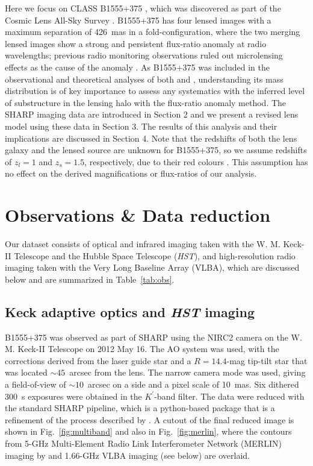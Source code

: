 \documentclass[a4paper,fleqn,usenatbib,useAMS]{mnras}
\begin{document}
Here we focus on CLASS B1555+375 \citep{Marlow99}, which was discovered as part of the Cosmic Lens All-Sky Survey \citep{CLASS1,CLASS2}. B1555+375 has four lensed images with a maximum separation of 426~mas in a fold-configuration, where the two merging lensed images show a strong and persistent flux-ratio anomaly at radio wavelengths; previous radio monitoring observations ruled out microlensing effects as the cause of the anomaly \citep{K03}. As B1555+375 was included in the observational and theoretical analyses of both \citet{Dalal2002} and \citet{Xu15}, understanding its mass distribution is of key importance to assess any systematics with the inferred level of substructure in the lensing halo with the flux-ratio anomaly method. The SHARP imaging data are introduced in Section 2 and we present a revised lens model using these data in Section 3. The results of this analysis and their implications are discussed in Section 4. Note that the redshifts of both the lens galaxy and the lensed source are unknown for B1555+375, so we assume redshifts of $z_l = 1$ and $z_s = 1.5$, respectively, due to their red colours \citep{Marlow99}. This assumption has no effect on the derived magnifications or flux-ratios of our analysis.

\section{Observations \& Data reduction}

Our dataset consists of optical and infrared imaging taken with the W. M. Keck-II Telescope and the Hubble Space Telescope ({\it HST}), and high-resolution radio imaging taken with the Very Long Baseline Array (VLBA), which are discussed below and are summarized in Table~\ref{tab:obs}.

\subsection{Keck adaptive optics and {\it HST} imaging}

B1555+375 was observed as part of SHARP using the NIRC2 camera on the W. M. Keck-II Telescope on 2012 May 16.  The AO system was used, with the corrections derived from the laser guide star and a $R=14.4$-mag tip-tilt star that was located $\sim45$~arcsec from the lens.  The narrow camera mode was used, giving a field-of-view of $\sim10$~arcsec on a side and a pixel scale of 10~mas. Six dithered 300~s exposures were obtained in the $K^{\prime}$-band filter.  The data were reduced with the standard SHARP pipeline, which is a python-based package that is a refinement of the process described by \citet{Auger_EELS1}.  A cutout of the final reduced image is shown in Fig.~\ref{fig:multiband} and also in Fig.~\ref{fig:merlin}, where the contours from 5-GHz Multi-Element Radio Link Interferometer Network (MERLIN) imaging by \citet{Marlow99} and 1.66-GHz VLBA imaging (see below) are overlaid.
\end{document}
